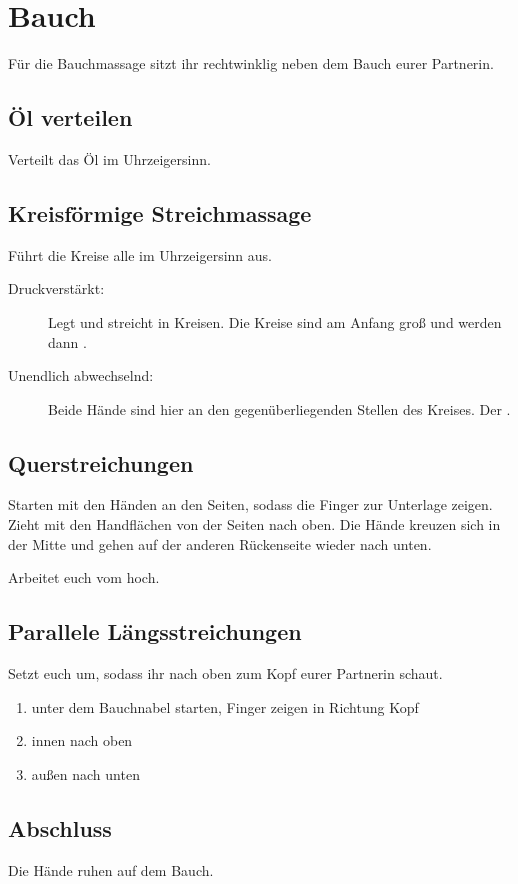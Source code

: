 \section{Bauch}

Für die Bauchmassage sitzt ihr rechtwinklig neben dem Bauch eurer Partnerin.

\subsection{Öl verteilen}
Verteilt das Öl  im Uhrzeigersinn.

\subsection{Kreisförmige Streichmassage}

Führt die Kreise alle im Uhrzeigersinn aus.

\begin{description}
  \item [Druckverstärkt:] Legt  und streicht in Kreisen. Die Kreise sind am Anfang groß und werden dann .
  \item [Unendlich abwechselnd:] Beide Hände sind hier an den gegenüberliegenden Stellen des Kreises. Der .
\end{description}

\subsection{Querstreichungen}
Starten mit den Händen an den Seiten, sodass die Finger zur Unterlage zeigen. Zieht mit den Handflächen von der Seiten nach oben. Die Hände kreuzen sich in der Mitte und gehen auf der anderen Rückenseite wieder nach unten.

Arbeitet euch vom  hoch.

\subsection{Parallele Längsstreichungen}

Setzt euch um, sodass ihr nach oben zum Kopf eurer Partnerin schaut.

\begin{oframed}

  \begin{enumerate}
    \item unter dem Bauchnabel starten, Finger zeigen in Richtung Kopf
    \item innen nach oben
    \item außen nach unten
  \end{enumerate}
\end{oframed}


\subsection{Abschluss}

Die Hände ruhen auf dem Bauch.

